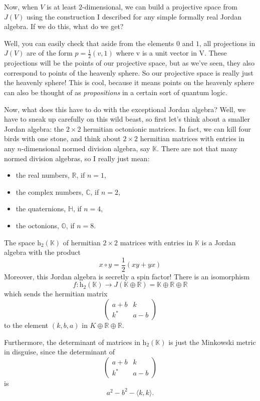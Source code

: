 \documentclass{article}
\def\tightlist{}
\begin{document}
Now, when \(V\) is at least \(2\)-dimensional, we can build a projective
space from \(J(V)\) using the construction I described for any simple
formally real Jordan algebra. If we do this, what do we get?

Well, you can easily check that aside from the elements \(0\) and \(1\),
all projections in \(J(V)\) are of the form \(p = \frac12(v,1)\) where v
is a unit vector in V. These projections will be the points of our
projective space, but as we've seen, they also correspond to points of
the heavenly sphere. So our projective space is really just the heavenly
sphere! This is cool, because it means points on the heavenly sphere can
also be thought of as \emph{propositions} in a certain sort of quantum
logic.

Now, what does this have to do with the exceptional Jordan algebra?
Well, we have to sneak up carefully on this wild beast, so first let's
think about a smaller Jordan algebra: the \(2\times2\) hermitian
octonionic matrices. In fact, we can kill four birds with one stone, and
think about \(2\times2\) hermitian matrices with entries in any
\(n\)-dimensional normed division algebra, say \(\mathbb{K}\). There are
not that many normed division algebras, so I really just mean:

\begin{itemize}
\tightlist
\item
  the real numbers, \(\mathbb{R}\), if \(n = 1\),
\item
  the complex numbers, \(\mathbb{C}\), if \(n = 2\),
\item
  the quaternions, \(\mathbb{H}\), if \(n = 4\),
\item
  the octonions, \(\mathbb{O}\), if \(n = 8\).
\end{itemize}

The space \(\mathrm{h}_2(\mathbb{K})\) of hermitian \(2\times2\)
matrices with entries in \(\mathbb{K}\) is a Jordan algebra with the
product \[x\circ y = \frac12(xy + yx)\] Moreover, this Jordan algebra is
secretly a spin factor! There is an isomorphism
\[f\colon \mathrm{h}_2(\mathbb{K}) \to J(\mathbb{K}\oplus\mathbb{R}) = \mathbb{K}\oplus\mathbb{R}\oplus\mathbb{R}\]
which sends the hermitian matrix \[
  \left(
    \begin{array}{cc}
      a+b&k
    \\k^*&a-b
    \end{array}
  \right)
\] to the element \((k,b,a)\) in \(K\oplus\mathbb{R}\oplus\mathbb{R}\).

Furthermore, the determinant of matrices in \(\mathrm{h}_2(\mathbb{K})\)
is just the Minkowski metric in disguise, since the determinant of \[
  \left(
    \begin{array}{cc}
      a+b&k
    \\k^*&a-b
    \end{array}
  \right)
\] is \[a^2-b^2-\langle k,k\rangle.\]
\end{document}
